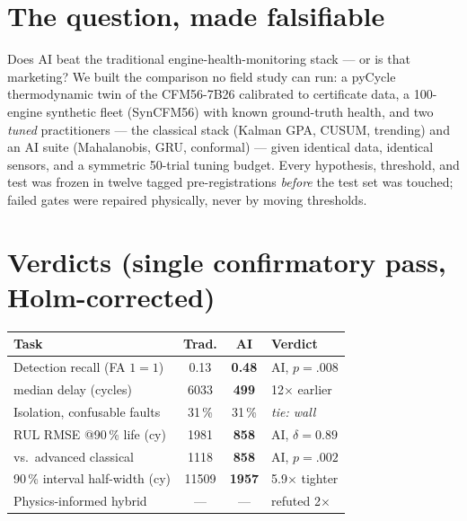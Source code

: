 \documentclass[11pt,twocolumn]{article}
\begin{document}

\balance
\section{The question, made falsifiable}
Does AI beat the traditional engine-health-monitoring stack --- or is that marketing? We
built the comparison no field study can run: a pyCycle thermodynamic twin of the CFM56-7B26
calibrated to certificate data, a 100-engine synthetic fleet (SynCFM56) with known
ground-truth health, and two \emph{tuned} practitioners --- the classical stack (Kalman GPA,
CUSUM, trending) and an AI suite (Mahalanobis, GRU, conformal) --- given identical data,
identical sensors, and a symmetric 50-trial tuning budget. Every hypothesis, threshold, and
test was frozen in twelve tagged pre-registrations \emph{before} the test set was touched;
failed gates were repaired physically, never by moving thresholds.

\section{Verdicts (single confirmatory pass, Holm-corrected)}
\begin{center}\small
\setlength{\tabcolsep}{3pt}
\begin{tabular}{@{}lccl@{}}
\toprule
Task & Trad. & AI & Verdict \\
\midrule
Detection recall (FA $1{=}1$) & 0.13 & \textbf{0.48} & AI, $p{=}.008$ \\
\quad median delay (cycles) & 6033 & \textbf{499} & 12$\times$ earlier \\
Isolation, confusable faults & 31\,\% & 31\,\% & \emph{tie: wall} \\
RUL RMSE @90\,\% life (cy) & 1981 & \textbf{858} & AI, $\delta{=}0.89$ \\
\quad vs.\ advanced classical & 1118 & \textbf{858} & AI, $p{=}.002$ \\
90\,\% interval half-width (cy) & 11509 & \textbf{1957} & 5.9$\times$ tighter \\
Physics-informed hybrid & --- & --- & refuted 2$\times$ \\
\bottomrule
\end{tabular}
\end{center}
\end{document}
